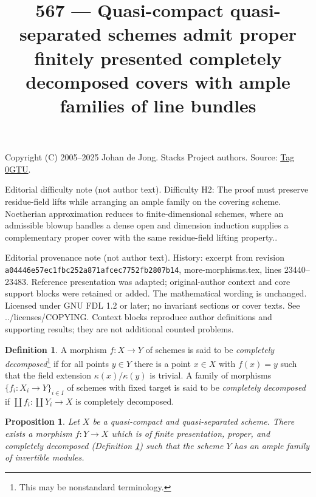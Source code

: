 \documentclass{amsart}
\theoremstyle{plain}
\newtheorem{proposition}[subsection]{Proposition}
\theoremstyle{definition}
\newtheorem{definition}[subsection]{Definition}
\theoremstyle{remark}
\numberwithin{equation}{subsection}
\begin{document}
\title[Stacks Project, Tag 0GTU]{567 --- Quasi-compact quasi-separated schemes admit proper finitely presented completely decomposed covers with ample families of line bundles}
\maketitle
\noindent Copyright (C) 2005--2025 Johan de Jong. Stacks Project authors. Source: \href{https://stacks.math.columbia.edu/tag/0GTU}{Tag 0GTU}.

\noindent Editorial difficulty note (not author text). Difficulty H2: The proof must preserve residue-field lifts while arranging an ample family on the covering scheme. Noetherian approximation reduces to finite-dimensional schemes, where an admissible blowup handles a dense open and dimension induction supplies a complementary proper cover with the same residue-field lifting property..

\noindent Editorial provenance note (not author text). History: excerpt from revision \texttt{a0444\allowbreak 6e57e\allowbreak c1fbc\allowbreak 252a8\allowbreak 71afc\allowbreak ec775\allowbreak 2fb28\allowbreak 07b14}, more-morphisms.tex, lines 23440--23483. Reference presentation was adapted; original-author context and core support blocks were retained or added. The mathematical wording is unchanged. Licensed under GNU FDL 1.2 or later; no invariant sections or cover texts. See ../licenses/COPYING. Context blocks reproduce author definitions and supporting results; they are not additional counted problems.

\begin{definition}
\label{definition-cd-morphism}
A morphism $f : X \to Y$ of schemes is said to be
{\it completely decomposed}\footnote{This may be nonstandard terminology.}
if for all points $y \in Y$ there
is a point $x \in X$ with $f(x) = y$ such that the field
extension $\kappa(x)/\kappa(y)$ is trivial.
A family of morphisms $\{f_i : X_i \to Y\}_{i \in I}$ of
schemes with fixed target is said to be {\it completely decomposed}
if $\coprod f_i : \coprod Y_i \to X$ is completely decomposed.
\end{definition}

\begin{proposition}
\label{proposition-envelope-with-resolution-property}
Let $X$ be a quasi-compact and quasi-separated scheme. There exists a
morphism $f : Y \to X$ which is of finite presentation, proper, and
completely decomposed (Definition \ref{definition-cd-morphism})
such that the scheme $Y$ has an ample family of invertible modules.
\end{proposition}
\end{document}
